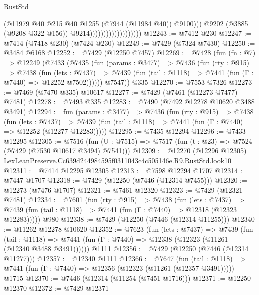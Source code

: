 \begin{lexlean}{RustStd}
\begin{coremodule}
                                              (@11979
                                                @40
                                                @215
                                                @40
                                                @1255
                                                (@7944 (@11984 @40))
                                                @9100)))
                                          @9202
                                          (@3885 (@9208 @322 @156))
                                          @9214)))))))))))))))))))
@12243 := @7412 @230
@12247 := @7414 (@7418 @230) (@7424 @230)
@12249 := @7429 (@7324 @7430)
@12250 := @3484 @6168
@12252 := @7429 (@12250 @7457)
@12269 := @7428
    (fun (fn : @7) =>
    @12249
      (@7433
        (@7435
          (fun (params : @3477) =>
          @7436
            (fun (rty : @915) =>
            @7438
              (fun (lets : @7437) =>
              @7439 (fun (tail : @1118) => @7441 (fun (Γ : @7440) => @12252 @7502))))))
        @7547))
    @335
@12270 := @7553 @7326
@12273 := @7469 (@7470 @335) @10617
@12277 := @7429 (@7461 (@12273 @7477) @7481)
@12278 := @7493 @335
@12283 := @7490 (@7492 @12278 @10620 @3488 @3491)
@12294 := fun (params : @3477) =>
  @7436
    (fun (rty : @915) =>
    @7438
      (fun (lets : @7437) =>
      @7439 (fun (tail : @1118) => @7441 (fun (Γ : @7440) => @12252 (@12277 @12283)))))
@12295 := @7435 @12294
@12296 := @7433 @12295
@12305 := @7516
    (fun (U : @7515) => @7517 (fun (t : @23) => @7524 (@7429 (@7530 @10617 @3494) @7541)))
@12309 := @12270 (@12296 @12305) LexLeanPreserve.Cc639d244984595f0311043c4c505146e.R9.RustStd.look10
@12311 := @7414 @12295 @12305
@12313 := @7598 @12294 @1707
@12314 := @7447 @1707
@12318 := @7429 (@12250 (@7446 (@12314 @7455)))
@12320 := @12273 (@7476 @1707)
@12321 := @7461 @12320
@12323 := @7429 (@12321 @7481)
@12334 := @7601
    (fun (rty : @915) =>
    @7438
      (fun (lets : @7437) =>
      @7439 (fun (tail : @1118) => @7441 (fun (Γ : @7440) => @12318 (@12323 @12283)))))
    @980
@12338 := @7429 (@12250 (@7446 (@12314 @11255)))
@12340 := @11262 @12278 @10620
@12352 := @7623
    (fun (lets : @7437) =>
    @7439
      (fun (tail : @1118) =>
      @7441 (fun (Γ : @7440) => @12338 (@12323 (@11261 (@12340 @3488 @3491))))))
    @1111
@12356 := @7429 (@12250 (@7446 (@12314 @11277)))
@12357 := @12340 @1111
@12366 := @7647
    (fun (tail : @1118) => @7441 (fun (Γ : @7440) => @12356 (@12323 (@11261 (@12357 @3491)))))
    @1715
@12370 := @7446 (@12314 (@11254 (@7451 @1716)))
@12371 := @12250 @12370
@12372 := @7429 @12371

\end{coremodule}
\end{lexlean}
